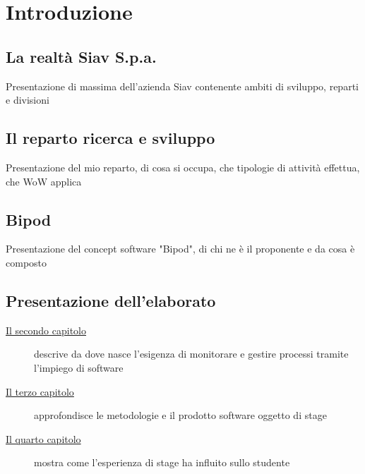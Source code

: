 
\chapter{Introduzione}
\label{cap:introduzione}


\section{La realtà Siav S.p.a.}

Presentazione di massima dell'azienda Siav contenente ambiti di sviluppo, reparti e divisioni

\section{Il reparto ricerca e sviluppo}

Presentazione del mio reparto, di cosa si occupa, che tipologie di attività effettua, che WoW applica

\section{Bipod}

Presentazione del concept software "Bipod", di chi ne è il proponente e da cosa è composto

\section{Presentazione dell'elaborato}
\begin{description}
    \item[{\hyperref[cap:process-mining]{Il secondo capitolo}}] descrive da dove nasce l'esigenza di monitorare e gestire processi tramite l'impiego di software
    
    \item[{\hyperref[cap:modalita-svolgimento]{Il terzo capitolo}}] approfondisce le metodologie e il prodotto software oggetto di stage
    
    \item[{\hyperref[cap:performance-stage]{Il quarto capitolo}}] mostra come l'esperienza di stage ha influito sullo studente
    
\end{description}


